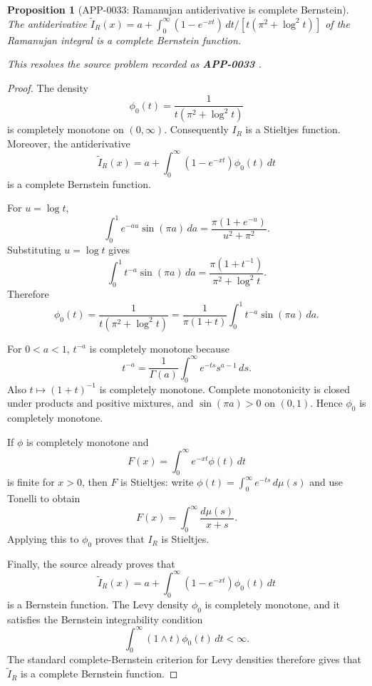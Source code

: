 \documentclass[11pt]{article}
\numberwithin{equation}{section}
\newtheorem{proposition}[theorem]{Proposition}
\theoremstyle{definition}
\theoremstyle{remark}
\newcommand{\1}{\mathbf 1}
\begin{document}
\begin{proposition}[APP-0033: Ramanujan antiderivative is complete Bernstein]
\label{res:ramanujan-antiderivative-complete-bernstein}
The antiderivative \(\widetilde I_R(x)=a+\int_0^\infty(1-e^{-xt})\,dt/[t(\pi^2+\log^2 t)]\) of the Ramanujan integral is a complete Bernstein function.

This resolves the source problem recorded as \textbf{APP-0033} \cite{mishra-swaminathan-ramanujan}.
\end{proposition}

\begin{proof}
The density
\[
\phi_0(t)=\frac{1}{t(\pi^2+\log^2 t)}
\]
is completely monotone on \((0,\infty)\). Consequently \(I_R\) is a Stieltjes function. Moreover, the antiderivative
\[
\widetilde I_R(x)=a+\int_0^\infty (1-e^{-xt})\phi_0(t)\,dt
\]
is a complete Bernstein function.

For \(u=\log t\),
\[
\int_0^1 e^{-au}\sin(\pi a)\,da
=\frac{\pi(1+e^{-u})}{u^2+\pi^2}.
\]
Substituting \(u=\log t\) gives
\[
\int_0^1 t^{-a}\sin(\pi a)\,da
=\frac{\pi(1+t^{-1})}{\pi^2+\log^2 t}.
\]
Therefore
\[
\phi_0(t)
=\frac{1}{t(\pi^2+\log^2 t)}
=\frac{1}{\pi(1+t)}\int_0^1 t^{-a}\sin(\pi a)\,da.
\]

For \(0<a<1\), \(t^{-a}\) is completely monotone because
\[
t^{-a}=\frac1{\Gamma(a)}\int_0^\infty e^{-ts}s^{a-1}\,ds.
\]
Also \(t\mapsto(1+t)^{-1}\) is completely monotone. Complete monotonicity is closed under products and positive mixtures, and \(\sin(\pi a)>0\) on \((0,1)\). Hence \(\phi_0\) is completely monotone.

If \(\phi\) is completely monotone and
\[
F(x)=\int_0^\infty e^{-xt}\phi(t)\,dt
\]
is finite for \(x>0\), then \(F\) is Stieltjes: write \(\phi(t)=\int_0^\infty e^{-ts}\,d\mu(s)\) and use Tonelli to obtain
\[
F(x)=\int_0^\infty\frac{d\mu(s)}{x+s}.
\]
Applying this to \(\phi_0\) proves that \(I_R\) is Stieltjes.

Finally, the source already proves that
\[
\widetilde I_R(x)=a+\int_0^\infty (1-e^{-xt})\phi_0(t)\,dt
\]
is a Bernstein function. The Levy density \(\phi_0\) is completely monotone, and it satisfies the Bernstein integrability condition
\[
\int_0^\infty (1\wedge t)\phi_0(t)\,dt<\infty.
\]
The standard complete-Bernstein criterion for Levy densities therefore gives that \(\widetilde I_R\) is a complete Bernstein function.
\end{proof}
\end{document}
